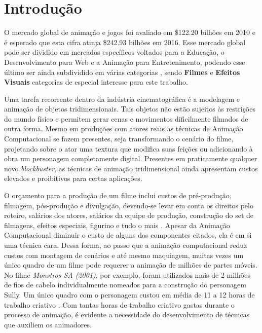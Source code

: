 \chapter{Introdução\label{chap:Introducao}}

O mercado global de animação e jogos foi avaliado em \$122.20 bilhões em 2010 e é esperado que esta cifra atinja  \$242.93 bilhões em 2016. Esse mercado global pode ser dividido em mercados específicos voltados para a Educação, o Desenvolvimento para Web e a Animação para Entretenimento, podendo esse último ser ainda subdividido em várias categorias \cite{animationMarketSize}, sendo \textbf{Filmes} e \textbf{Efeitos Visuais} categorias de especial interesse para este trabalho. 

Uma tarefa recorrente dentro da indústria cinematográfica é a modelagem e animação de objetos tridimensionais. Tais objetos não estão sujeitos às restrições do mundo físico e permitem gerar cenas e movimentos dificilmente filmados de outra forma. Mesmo em produções com atores reais as técnicas de Animação Computacional se fazem presentes, seja transformando o cenário do filme, projetando sobre o ator uma textura que modifica suas feições ou adicionando à obra um personagem completamente digital. Presentes em praticamente qualquer novo \textit{blockbuster}, as técnicas de animação tridimensional ainda apresentam custos elevados e proibitivos para certas aplicações.

O orçamento para a produção de um filme inclui custos de pré-produção, filmagem, pós-produção e divulgação, devendo-se levar em conta os direitos pelo roteiro, salários dos atores, salários da equipe de produção, construção do set de filmagens, efeitos especiais, figurino e tudo o mais \cite{movieProductionCost}. Apesar da Animação Computacional diminuir o custo de alguns dos componentes citados, ela é em si uma técnica cara. Dessa forma, ao passo que a animação computacional  reduz custos com montagem de cenários e até mesmo maquiagem, muitas vezes um único quadro de um filme pode requerer a animação de milhões de partes móveis. No filme \textit{Monstros SA (2001)}, por exemplo, foram utilizados mais de 2 milhões de fios de cabelo individualmente nomeados para a construção do personagem Sully. Um único quadro com o personagem custou em média de 11 a 12 horas de trabalho criativo \cite{sullyExample}. Com tantas horas de trabalho criativo gastas durante o processo de animação, é evidente a necessidade do desenvolvimento de técnicas que auxiliem os animadores.

